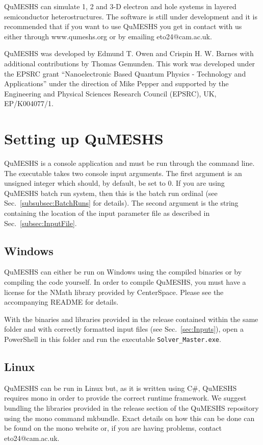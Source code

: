 \documentclass[12pt]{article}
\begin{document}
QuMESHS can simulate 1, 2 and 3-D electron and hole systems in layered semiconductor heterostructures.  The software is still under development and it is recommended that if you want to use QuMESHS you get in contact with us either through www.qumeshs.org or by emailing eto24@cam.ac.uk.

QuMESHS was developed by Edmund T. Owen and Crispin H. W. Barnes with additional contributions by Thomas Gemunden. This work was developed under the EPSRC grant ``Nanoelectronic Based Quantum Physics - Technology and Applications'' under the direction of Mike Pepper and supported by the Engineering and Physical Sciences Research Council (EPSRC), UK, EP/K004077/1.


\section{Setting up QuMESHS}
\label{sec:Setup}

QuMESHS is a console application and must be run through the command line.  The executable takes two console input arguments.  The first argument is an unsigned integer which should, by default, be set to 0.  If you are using QuMESHS batch run system, then this is the batch run ordinal (see Sec.~\ref{subsubsec:BatchRuns} for details).  The second argument is the string containing the location of the input parameter file as described in Sec.~\ref{subsec:InputFile}.

\subsection{Windows}
\label{subsec:SetupWindows}

QuMESHS can either be run on Windows using the compiled binaries or by compiling the code yourself.  In order to compile QuMESHS, you must have a license for the NMath library provided by CenterSpace.  Please see the accompanying README for details.

With the binaries and libraries provided in the release contained within the same folder and with correctly formatted input files (see Sec.~\ref{sec:Inputs}), open a PowerShell in this folder and run the executable \texttt{Solver\_Master.exe}. 

\subsection{Linux}
\label{subsec:SetupLinux}

QuMESHS can be run in Linux but, as it is written using C\#, QuMESHS requires mono in order to provide the correct runtime framework.  We suggest bundling the libraries provided in the release section of the QuMESHS repository using the mono command mkbundle.  Exact details on how this can be done can be found on the mono website or, if you are having problems, contact eto24@cam.ac.uk.
\end{document}
